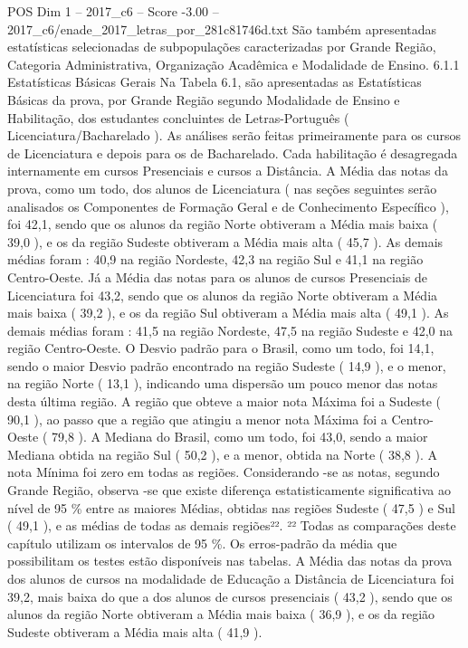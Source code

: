 \begin{textsample}{POS Dim 1 – 2017\_c6 – Score -3.00 – 2017\_c6/enade\_2017\_letras\_por\_281c81746d.txt}
São também apresentadas estatísticas selecionadas de subpopulações caracterizadas por Grande Região, Categoria Administrativa, Organização Acadêmica e Modalidade de Ensino. 6.1.1 Estatísticas Básicas Gerais Na Tabela 6.1, são apresentadas as Estatísticas Básicas da prova, por Grande Região segundo Modalidade de Ensino e Habilitação, dos estudantes concluintes de Letras-Português ( Licenciatura/Bacharelado ).
As análises serão feitas primeiramente para os cursos de Licenciatura e depois para os de Bacharelado.
Cada habilitação é desagregada internamente em cursos Presenciais e cursos a Distância.
A Média das notas da prova, como um todo, dos alunos de Licenciatura ( nas seções seguintes serão analisados os Componentes de Formação Geral e de Conhecimento Específico ), foi 42,1, sendo que os alunos da região Norte obtiveram a Média mais baixa ( 39,0 ), e os da região Sudeste obtiveram a Média mais alta ( 45,7 ).
As demais médias foram : 40,9 na região Nordeste, 42,3 na região Sul e 41,1 na região Centro-Oeste.
Já a Média das notas para os alunos de cursos Presenciais de Licenciatura foi 43,2, sendo que os alunos da região Norte obtiveram a Média mais baixa ( 39,2 ), e os da região Sul obtiveram a Média mais alta ( 49,1 ).
As demais médias foram : 41,5 na região Nordeste, 47,5 na região Sudeste e 42,0 na região Centro-Oeste.
O Desvio padrão para o Brasil, como um todo, foi 14,1, sendo o maior Desvio padrão encontrado na região Sudeste ( 14,9 ), e o menor, na região Norte ( 13,1 ), indicando uma dispersão um pouco menor das notas desta última região.
A região que obteve a maior nota Máxima foi a Sudeste ( 90,1 ), ao passo que a região que atingiu a menor nota Máxima foi a Centro-Oeste ( 79,8 ).
A Mediana do Brasil, como um todo, foi 43,0, sendo a maior Mediana obtida na região Sul ( 50,2 ), e a menor, obtida na Norte ( 38,8 ).
A nota Mínima foi zero em todas as regiões.
Considerando -se as notas, segundo Grande Região, observa -se que existe diferença estatisticamente significativa ao nível de 95 \% entre as maiores Médias, obtidas nas regiões Sudeste ( 47,5 ) e Sul ( 49,1 ), e as médias de todas as demais regiões²². ²² Todas as comparações deste capítulo utilizam os intervalos de 95 \%.
Os erros-padrão da média que possibilitam os testes estão disponíveis nas tabelas.
A Média das notas da prova dos alunos de cursos na modalidade de Educação a Distância de Licenciatura foi 39,2, mais baixa do que a dos alunos de cursos presenciais ( 43,2 ), sendo que os alunos da região Norte obtiveram a Média mais baixa ( 36,9 ), e os da região Sudeste obtiveram a Média mais alta ( 41,9 ).

\end{textsample}
